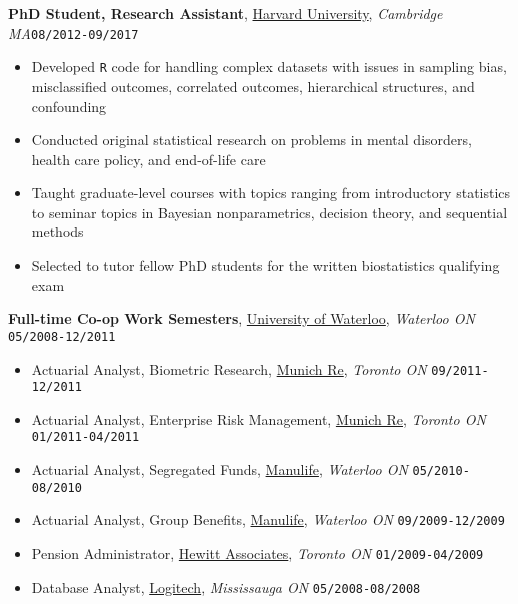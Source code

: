 \documentclass[10pt,english]{article}
\begin{document}
\vspace{2mm}

\textbf{PhD Student, Research Assistant}, \textcolor{blue}{\href{https://gsas.harvard.edu/programs-of-study/all/biostatistics}{Harvard University}}, \textit{Cambridge
MA}\hfill \texttt{08/2012-09/2017}
\begin{itemize}
\item Developed \texttt{R} code for handling complex datasets with issues in sampling bias, misclassified outcomes, correlated outcomes, hierarchical structures, and confounding
\item Conducted original statistical research on problems in mental disorders, health care policy, and end-of-life care
\item Taught graduate-level courses with topics ranging from introductory statistics to seminar topics in Bayesian nonparametrics, decision theory, and sequential methods
\item Selected to tutor fellow PhD students for the written biostatistics qualifying exam
\end{itemize}

\vspace{2mm}

\textbf{Full-time Co-op Work Semesters}, \textcolor{blue}{\href{https://uwaterloo.ca/math/}{University of Waterloo}}, \textit{Waterloo ON} \hfill \texttt{05/2008-12/2011}
\begin{itemize}
\item Actuarial Analyst, Biometric Research, \textcolor{blue}{\href{https://www.munichre.com/ca}{Munich Re}}, \textit{Toronto ON} \hfill \texttt{09/2011-12/2011}
\item Actuarial Analyst, Enterprise Risk Management, \textcolor{blue}{\href{https://www.munichre.com/ca}{Munich Re}}, \textit{Toronto ON} \hfill \texttt{01/2011-04/2011}
\item Actuarial Analyst, Segregated Funds, \textcolor{blue}{\href{https://www.manulife.ca}{Manulife}}, \textit{Waterloo ON} \hfill \texttt{05/2010-08/2010}
\item Actuarial Analyst, Group Benefits, \textcolor{blue}{\href{https://www.manulife.ca}{Manulife}}, \textit{Waterloo ON} \hfill \texttt{09/2009-12/2009}
\item Pension Administrator, \textcolor{blue}{\href{http://www.aonhewitt.com}{Hewitt Associates}}, \textit{Toronto ON} \hfill \texttt{01/2009-04/2009}
\item Database Analyst, \textcolor{blue}{\href{https://www.logitech.com/en-ca}{Logitech}}, \textit{Mississauga ON} \hfill \texttt{05/2008-08/2008}
\end{itemize}
\end{document}
